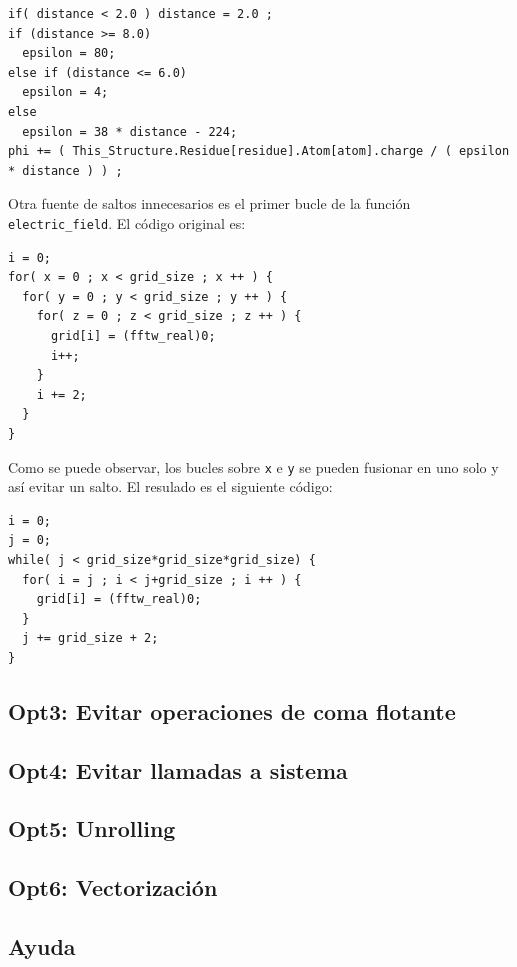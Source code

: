 \begin{lstlisting}[]
if( distance < 2.0 ) distance = 2.0 ;
if (distance >= 8.0)
  epsilon = 80;
else if (distance <= 6.0)
  epsilon = 4;
else
  epsilon = 38 * distance - 224;
phi += ( This_Structure.Residue[residue].Atom[atom].charge / ( epsilon * distance ) ) ;
\end{lstlisting}

Otra fuente de saltos innecesarios es el primer bucle de la funci\'{o}n
\texttt{electric\_field}. El c\'{o}digo original es:

\begin{lstlisting}
i = 0;
for( x = 0 ; x < grid_size ; x ++ ) {
  for( y = 0 ; y < grid_size ; y ++ ) {
    for( z = 0 ; z < grid_size ; z ++ ) {
      grid[i] = (fftw_real)0;
      i++;
    }
    i += 2;
  }
}
\end{lstlisting}

Como se puede observar, los bucles sobre \texttt{x} e \texttt{y} se pueden
fusionar en uno solo y as\'{i} evitar un salto. El resulado es el siguiente
c\'{o}digo:

\begin{lstlisting}
i = 0; 
j = 0;
while( j < grid_size*grid_size*grid_size) {
  for( i = j ; i < j+grid_size ; i ++ ) {
    grid[i] = (fftw_real)0;
  }
  j += grid_size + 2;
}
\end{lstlisting}

\subsection{Opt3: Evitar operaciones de coma flotante}

\subsection{Opt4: Evitar llamadas a sistema}

\subsection{Opt5: Unrolling}

\subsection{Opt6: Vectorizaci\'{o}n}

\subsection{Ayuda}

